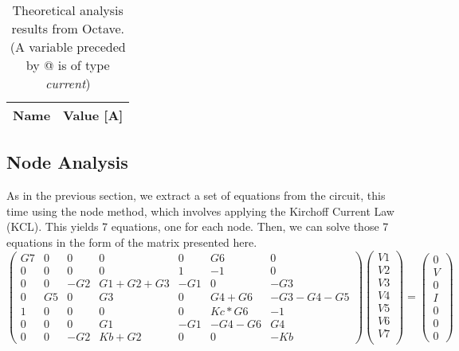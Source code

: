 \begin{table}[h]
  \centering
  \begin{tabular}{|l|r|}
    \hline    
    {\bf Name} & {\bf Value [A]} \\ \hline
     
  \end{tabular}
  \caption{Theoretical analysis results from Octave. (A variable preceded by @ is of type {\em current})}
  \label{tab:mesh}
\end{table}

\subsection{Node Analysis}

As in the previous section, we extract a set of equations from the circuit, this time using the node method, which involves applying the Kirchoff Current Law (KCL). This yields 7 equations, one for each node. Then, we can solve those 7 equations in the form of the matrix presented here.
\begin{equation}
\begin{pmatrix}
G7 & 0 & 0 & 0 & 0 & G6 & 0\\
0 & 0 & 0 & 0 & 1 & -1 & 0\\
0 & 0 & -G2 & G1+G2+G3 & -G1 & 0 & -G3\\
0 & G5 & 0 & G3 & 0 & G4+G6 & -G3-G4-G5\\
1 & 0 & 0 & 0 & 0& Kc*G6 & -1\\
0 & 0 & 0 & G1 & -G1 & -G4-G6 & G4\\
0 & 0 & -G2 & Kb+G2 & 0 & 0 & -Kb
\end{pmatrix}
\begin{pmatrix}
V1\\
V2\\
V3\\
V4\\
V5\\
V6\\
V7\\
\end{pmatrix}
=
\begin{pmatrix}
0\\
V\\
0\\
I\\
0\\
0\\
0
\end{pmatrix}
\end{equation}

